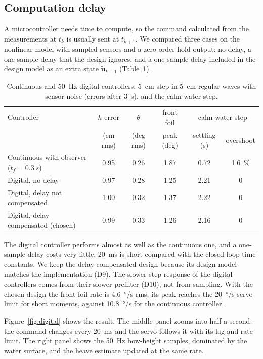 \documentclass[11pt,a4paper]{article}
\begin{document}
\subsection{Computation delay}
\label{sec:delay}

A microcontroller needs time to compute, so the command calculated from the
measurements at $t_k$ is usually sent at $t_{k+1}$. We compared three cases on
the nonlinear model with sampled sensors and a zero-order-hold output: no
delay, a one-sample delay that the design ignores, and a one-sample delay
included in the design model as an extra state $\tilde{\bm u}_{k-1}$
(Table~\ref{tab:digital}).

\begin{table}[htbp]
\centering
\small
\caption{Continuous and \SI{50}{Hz} digital controllers: \SI{5}{cm} step in
\SI{5}{cm} regular waves with sensor noise (errors after \SI{3}{s}), and the
calm-water step.}
\label{tab:digital}
\begin{tabular}{@{}lccccc@{}}
\toprule
Controller & $h$ error & $\theta$ & front foil & \multicolumn{2}{c}{calm-water step} \\
 & (cm rms) & (deg rms) & peak (deg) & settling (s) & overshoot \\ \midrule
Continuous with observer ($t_f=\SI{0.3}{s}$) & 0.95 & 0.26 & 1.87 & 0.72 & \SI{1.6}{\percent} \\
Digital, no delay & 0.97 & 0.28 & 1.25 & 2.21 & 0 \\
Digital, delay not compensated & 1.00 & 0.32 & 1.37 & 2.22 & 0 \\
Digital, delay compensated (chosen) & 0.99 & 0.33 & 1.26 & 2.16 & 0 \\
\bottomrule
\end{tabular}
\end{table}

The digital controller performs almost as well as the continuous one, and a
one-sample delay costs very little: \SI{20}{ms} is short compared with the
closed-loop time constants. We keep the delay-compensated design because its
design model matches the implementation (D9). The slower step response of the
digital controllers comes from their slower prefilter (D10), not from sampling.
With the chosen design the front-foil rate is \SI{4.6}{\degree/s} rms; its peak
reaches the \SI{20}{\degree/s} servo limit for short moments, against
\SI{10.8}{\degree/s} for the continuous controller.

Figure~\ref{fig:digital} shows the result. The middle panel zooms into half a
second: the command changes every \SI{20}{ms} and the servo follows it with its
lag and rate limit. The right panel shows the \SI{50}{Hz} bow-height samples,
dominated by the water surface, and the heave estimate updated at the same rate.
\end{document}
